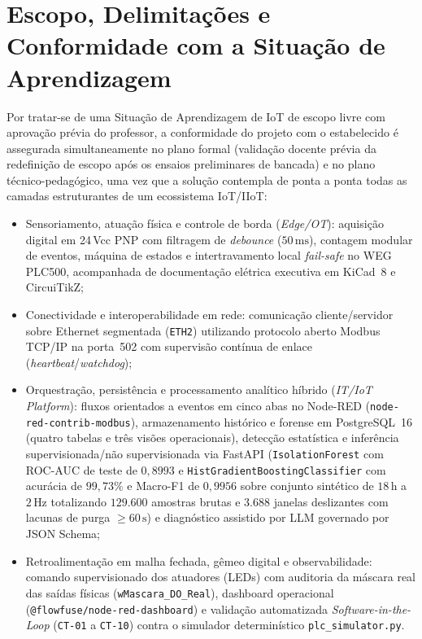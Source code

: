 \section{Escopo, Delimitações e Conformidade com a Situação de Aprendizagem}
\label{sec:escopo}

Por tratar-se de uma Situação de Aprendizagem de IoT de escopo livre com aprovação prévia do professor, a conformidade do projeto com o estabelecido é assegurada simultaneamente no plano formal (validação docente prévia da redefinição de escopo após os ensaios preliminares de bancada) e no plano técnico-pedagógico, uma vez que a solução contempla de ponta a ponta todas as camadas estruturantes de um ecossistema IoT/IIoT:
\begin{itemize}
  \item Sensoriamento, atuação física e controle de borda (\textit{Edge/OT}): aquisição digital em 24\,Vcc PNP com filtragem de \textit{debounce} ($50\,\text{ms}$), contagem modular de eventos, máquina de estados e intertravamento local \textit{fail-safe} no WEG PLC500, acompanhada de documentação elétrica executiva em KiCad~8 e CircuiTikZ;
  \item Conectividade e interoperabilidade em rede: comunicação cliente/servidor sobre Ethernet segmentada (\texttt{ETH2}) utilizando protocolo aberto Modbus TCP/IP na porta~502 com supervisão contínua de enlace (\textit{heartbeat}/\textit{watchdog});
  \item Orquestração, persistência e processamento analítico híbrido (\textit{IT/IoT Platform}): fluxos orientados a eventos em cinco abas no Node-RED (\texttt{node-red-\allowbreak contrib-\allowbreak modbus}), armazenamento histórico e forense em PostgreSQL~16 (quatro tabelas e três visões operacionais), detecção estatística e inferência supervisionada/não supervisionada via FastAPI (\texttt{Isolation\allowbreak Forest} com ROC-AUC de teste de $0{,}8993$ e \texttt{HistGradient\allowbreak Boosting\allowbreak Classifier} com acurácia de $99{,}73\%$ e Macro-F1 de $0{,}9956$ sobre conjunto sintético de $18\,\text{h}$ a $2\,\text{Hz}$ totalizando $129.600$ amostras brutas e $3.688$ janelas deslizantes com lacunas de purga $\ge 60\,\text{s}$) e diagnóstico assistido por LLM governado por JSON Schema;
  \item Retroalimentação em malha fechada, gêmeo digital e observabilidade: comando supervisionado dos atuadores (LEDs) com auditoria da máscara real das saídas físicas (\texttt{wMascara\_\allowbreak DO\_\allowbreak Real}), dashboard operacional (\texttt{@flowfuse/\allowbreak node-red-\allowbreak dashboard}) e validação automatizada \textit{Software-in-the-Loop} (\texttt{CT-01} a \texttt{CT-10}) contra o simulador determinístico \texttt{plc\_\allowbreak simulator.py}.
\end{itemize}

